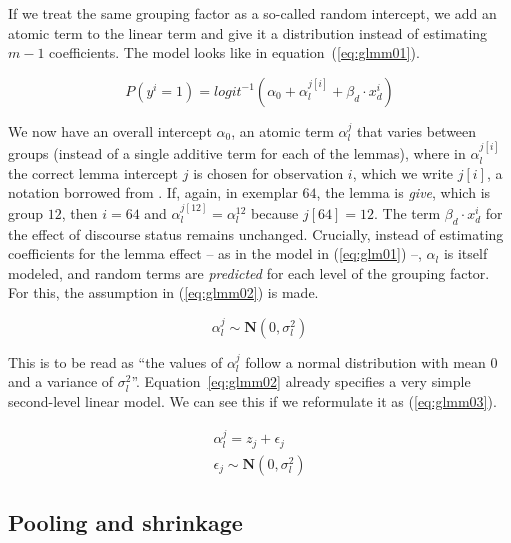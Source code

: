 \documentclass[a4paper,12pt]{article}
\begin{document}
If we treat the same grouping factor as a so-called random intercept, we add an atomic term to the linear term and give it a distribution instead of estimating $m-1$ coefficients.
The model looks like in equation~(\ref{eq:glmm01}).

\begin{equation}
  P(y^i=1)=logit^{-1}(\alpha_0+\alpha_{l}^{j[i]}+\beta_d\cdot x_d^i)
  \label{eq:glmm01}
\end{equation}

We now have an overall intercept $\alpha_0$, an atomic term $\alpha_l^j$ that varies between groups (instead of a single additive term for each of the lemmas), where in $\alpha_l^{j[i]}$ the correct lemma intercept $j$ is chosen for observation $i$, which we write $j[i]$, a notation borrowed from \citet{GelmanHill2006}.
If, again, in exemplar $64$, the lemma is \textit{give}, which is group $12$, then $i=64$ and $\alpha_l^{j[12]}=\alpha_l^{12}$ because $j[64]=12$.
The term $\beta_d\cdot x_d^i$ for the effect of discourse status remains unchanged.
Crucially, instead of estimating coefficients for the lemma effect -- as in the model in (\ref{eq:glm01}) --, $\alpha_l$ is itself modeled, and random terms are \textit{predicted} for each level of the grouping factor.
For this, the assumption in (\ref{eq:glmm02}) is made.

\begin{equation}
  \alpha_l^j\sim\mathbf{N}(0,\sigma_l^2)
  \label{eq:glmm02}
\end{equation}

This is to be read as ``the values of $\alpha_l^j$ follow a normal distribution with mean $0$ and a variance of $\sigma_l^2$''.
Equation~\ref{eq:glmm02} already specifies a very simple second-level linear model.
We can see this if we reformulate it as (\ref{eq:glmm03}).

\begin{equation}
  \begin{split}
    \alpha_l^j=z_j+\epsilon_j\\
    \epsilon_j\sim\mathbf{N}(0,\sigma_l^2)
  \end{split}
  \label{eq:glmm03}
\end{equation}




\subsection{Pooling and shrinkage}
\label{sec:poolingandshrinkage}
\end{document}
